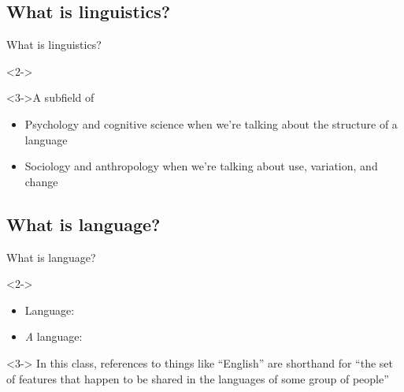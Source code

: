 \documentclass{beamer}
\newcommand{\subtwoone}{What is linguistics?}
\newcommand{\subtwotwo}{What is language?}
\begin{document}
    \subsection{\subtwoone}
      \begin{frame}{\subtwoone}
        \begin{definition}<2->
          
        \end{definition}
        \begin{block}<3->{A subfield of}
          \begin{itemize}
            \item Psychology and cognitive science when we're talking about the structure of a language
            \item Sociology and anthropology when we're talking about use, variation, and change
          \end{itemize}
        \end{block}
      \end{frame}

    \subsection{\subtwotwo}
      \begin{frame}{\subtwotwo}
        \begin{definition}<2->{}
          \begin{itemize}
            \item \alert{Language}: 
            \item \alert{\emph{A} language}: 
          \end{itemize}
        \end{definition}
        \begin{alertblock}<3->{}
          In this class, references to things like ``English'' are shorthand for ``the set of features that happen to be shared in the languages of some group of people''
        \end{alertblock}
      \end{frame}
\end{document}
